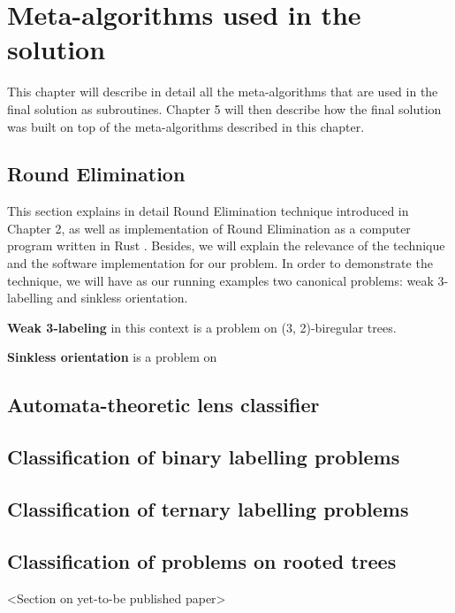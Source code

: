 \chapter{Meta-algorithms used in the solution}
\label{chapter:environment}

This chapter will describe in detail all the meta-algorithms that are
used in the final solution as subroutines.
Chapter 5 will then
describe how the final solution was built on top of the meta-algorithms
described in this chapter.

\section{Round Elimination}

This section explains in detail Round Elimination
technique introduced in Chapter 2, as well as
implementation of Round Elimination as a computer
program written in Rust \cite{Brandt2019, Olivetti2020}.
Besides, we will explain the relevance of the technique
and the software implementation for our problem. In order
to demonstrate the technique, we will have as our running
examples two canonical problems: weak 3-labelling and sinkless orientation.

\textbf{Weak 3-labeling} in this context is a problem on (3, 2)-biregular
trees.

\textbf{Sinkless orientation} is a problem on 

\section{Automata-theoretic lens classifier}

\section{Classification of binary labelling problems}

\section{Classification of ternary labelling problems}

\section{Classification of problems on rooted trees}

<Section on yet-to-be published paper>

